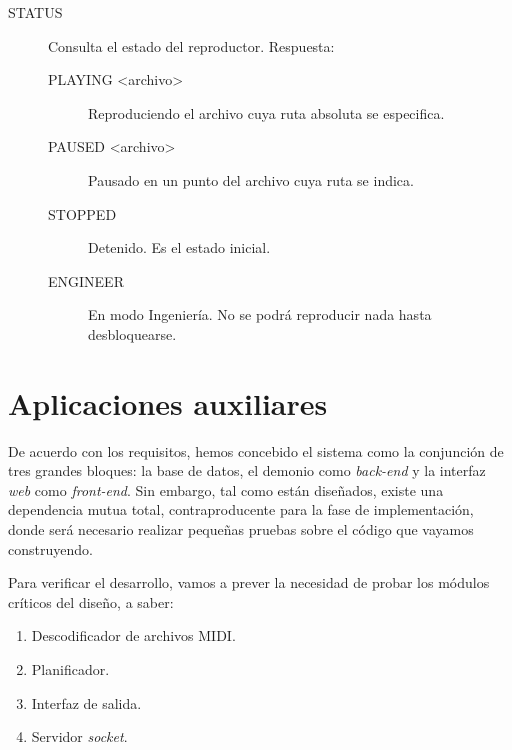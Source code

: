 \begin{description}
	\item[STATUS] Consulta el estado del reproductor. Respuesta:
	
	\begin{description}
		\item[PLAYING <archivo>] Reproduciendo el archivo cuya ruta absoluta se especifica.
		\item[PAUSED <archivo>] Pausado en un punto del archivo cuya ruta se indica.
		\item[STOPPED] Detenido. Es el estado inicial.
		\item[ENGINEER] En modo Ingeniería. No se podrá reproducir nada hasta desbloquearse.
	\end{description}
	
\end{description}

\section{Aplicaciones auxiliares}

De acuerdo con los requisitos, hemos concebido el sistema como la conjunción de tres grandes bloques: la base de datos, el demonio como \textit{back-end} y la interfaz \textit{web} como \textit{front-end}. Sin embargo, tal como están diseñados, existe una dependencia mutua total, contraproducente para la fase de implementación, donde será necesario realizar pequeñas pruebas sobre el código que vayamos construyendo.

Para verificar el desarrollo, vamos a prever la necesidad de probar los módulos críticos del diseño, a saber:

\begin{enumerate}
	\item Descodificador de archivos \acrshort{MIDI}.
	\item Planificador.
	\item Interfaz de salida.
	\item Servidor \textit{socket}.
\end{enumerate}

\smallskip

